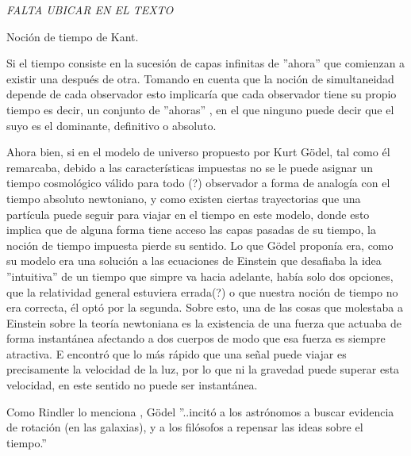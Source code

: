 \documentclass[11pt]{book}
\begin{document}
\vspace{3em}


\emph{FALTA UBICAR EN EL TEXTO}

Noción de tiempo de Kant.

Si el tiempo consiste en la sucesión de capas infinitas de ''ahora'' que comienzan a existir una después de otra. Tomando en cuenta que la noción de simultaneidad depende de cada observador esto implicaría que cada observador tiene su propio tiempo es decir, un conjunto de ''ahoras'' \cite{remark}, en el que ninguno puede decir que el suyo es el dominante, definitivo o absoluto.

Ahora bien, si en el modelo de universo propuesto por Kurt Gödel, tal como él remarcaba, debido a las características impuestas no se le puede asignar un tiempo cosmológico válido para todo (?) observador a forma de analogía con el tiempo absoluto newtoniano, y como existen ciertas trayectorias que una partícula puede seguir para viajar en el tiempo en este modelo, donde esto implica que de alguna forma tiene acceso las capas pasadas de su tiempo, la noción de tiempo impuesta pierde su sentido.
Lo que Gödel proponía era, como su modelo era una solución a las ecuaciones de Einstein que desafiaba la idea ''intuitiva'' de un tiempo que simpre va hacia adelante, había solo dos opciones, que la relatividad general estuviera errada(?) o que nuestra noción de tiempo no era correcta, él optó por la segunda.
% 
Sobre esto, una de las cosas que molestaba a Einstein sobre la teoría newtoniana es la existencia de una fuerza que actuaba de forma instantánea afectando a dos cuerpos de modo que esa fuerza es siempre atractiva. E encontró que lo más rápido que una señal puede viajar es precisamente la velocidad de la luz, por lo que ni la gravedad puede superar esta velocidad, en este sentido no puede ser instantánea. 

Como Rindler lo menciona \cite{rindler}, Gödel ''..incitó a los astrónomos a buscar evidencia de rotación (en las galaxias), y a los filósofos a repensar las ideas sobre el tiempo.'' 
%


\end{document}

